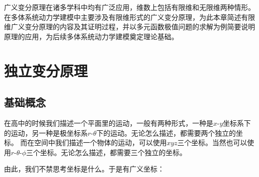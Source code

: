 广义变分原理在诸多学科中均有广泛应用，维数上包括有限维和无限维两种情形。在多体系统动力学建模中主要涉及有限维形式的广义变分原理，为此本章简述有限维广义变分原理的内容及其证明过程，并以多元函数极值问题的求解为例简要说明原理的应用，为后续多体系统动力学建模奠定理论基础。

\section{独立变分原理}
\subsection{基础概念}
在高中的时候我们描述一个平面里的运动，一般有两种形式，一种是$x$-$y$坐标系下的运动，另一种是极坐标系$r$-$\theta$下的运动。无论怎么描述，都需要两个独立的坐标。
而在空间中我们描述一个物体的运动，可以使用$x$$y$$z$三个坐标。当然也可以使用$r$-$\theta$-$\phi$三个坐标。无论怎么描述，都需要三个独立的坐标。

由此，我们不禁思考坐标是什么。于是有广义坐标：

